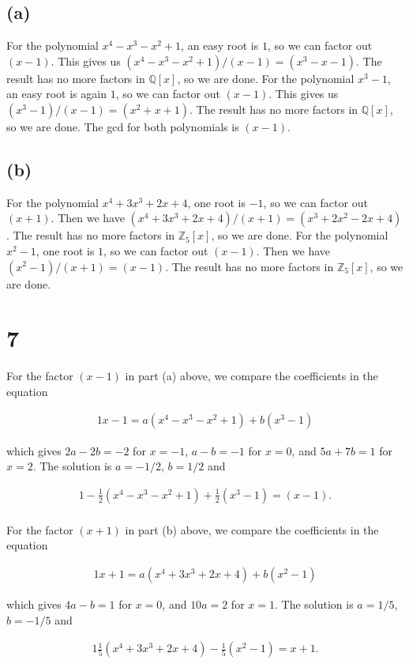 \documentclass{article}
\begin{document}
\subsection*{(a)}

For the polynomial $x^4 - x^3 - x^2 + 1$, an easy root is $1$, so we can factor out $(x - 1)$.  
This gives us $(x^4 - x^3 - x^2 + 1)/(x-1) = (x^3 - x - 1)$.  The result has no more factors in 
$\mathbb{Q}[x]$, so we are done.
For the polynomial $x^3 - 1$, an easy root is again $1$, so we can factor out $(x - 1)$.  
This gives us $(x^3 - 1)/(x - 1) = (x^2 + x + 1)$.  The result has no more factors in 
$\mathbb{Q}[x]$, so we are done.  The gcd for both polynomials is $(x - 1)$.

\subsection*{(b)}

For the polynomial $x^4 + 3x^3 + 2x + 4$, one root is $-1$, so we can factor out $(x + 1)$.
Then we have $(x^4 + 3x^3 + 2x + 4)/(x + 1) = (x^3 + 2x^2 - 2x + 4)$.  The result has 
no more factors in $\mathbb{Z}_5[x]$, so we are done.
For the polynomial $x^2 - 1$, one root is $1$, so we can factor out $(x - 1)$.
Then we have $(x^2 - 1)/(x + 1) = (x - 1)$.  The result has no more factors in 
$\mathbb{Z}_5[x]$, so we are done.

\section*{7}

For the factor $(x - 1)$ in part (a) above, we compare the coefficients in the equation

\begin{alignat*}{1}
    x - 1 = a(x^4 - x^3 - x^2 + 1) + b(x^3 - 1)
\end{alignat*}

which gives $2a - 2b = -2$ for $x = -1$, $a - b = -1$ for $x = 0$, and 
$5a + 7b = 1$ for $x = 2$.  The solution is $a = -1/2$, $b = 1/2$ and 

\begin{alignat*}{1}
    -\frac{1}{2}(x^4 - x^3 - x^2 + 1) + \frac{1}{2}(x^3 - 1) = (x - 1). \\
\end{alignat*}

For the factor $(x + 1)$ in part (b) above, we compare the coefficients in the equation 

\begin{alignat*}{1}
    x + 1 = a(x^4 + 3x^3 + 2x + 4) + b(x^2 - 1) 
\end{alignat*}

which gives $4a - b = 1$ for $x = 0$, and $10a = 2$ for $x = 1$.  The solution is 
$a = 1/5$, $b = -1/5$ and 

\begin{alignat*}{1}
    \frac{1}{5}(x^4 + 3x^3 + 2x + 4) - \frac{1}{5}(x^2 - 1) = x + 1. \\ 
\end{alignat*}
\end{document}
